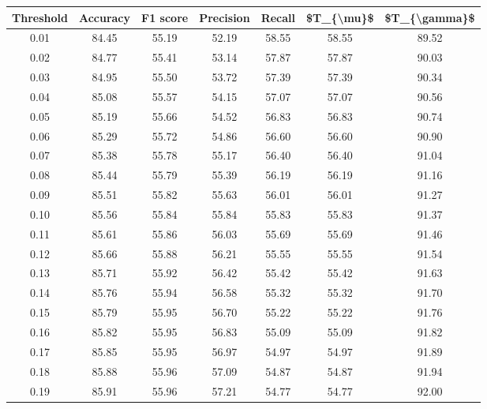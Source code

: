 \begin{tabular}{|c|c|c|c|c|c|c|}
\hline
 Threshold &  Accuracy &  F1 score &  Precision &  Recall &  \$T\_\{\textbackslash mu\}\$ &  \$T\_\{\textbackslash gamma\}\$ \\
\hline
      0.01 &     84.45 &     55.19 &      52.19 &   58.55 &      58.55 &         89.52 \\
      0.02 &     84.77 &     55.41 &      53.14 &   57.87 &      57.87 &         90.03 \\
      0.03 &     84.95 &     55.50 &      53.72 &   57.39 &      57.39 &         90.34 \\
      0.04 &     85.08 &     55.57 &      54.15 &   57.07 &      57.07 &         90.56 \\
      0.05 &     85.19 &     55.66 &      54.52 &   56.83 &      56.83 &         90.74 \\
      0.06 &     85.29 &     55.72 &      54.86 &   56.60 &      56.60 &         90.90 \\
      0.07 &     85.38 &     55.78 &      55.17 &   56.40 &      56.40 &         91.04 \\
      0.08 &     85.44 &     55.79 &      55.39 &   56.19 &      56.19 &         91.16 \\
      0.09 &     85.51 &     55.82 &      55.63 &   56.01 &      56.01 &         91.27 \\
      0.10 &     85.56 &     55.84 &      55.84 &   55.83 &      55.83 &         91.37 \\
      0.11 &     85.61 &     55.86 &      56.03 &   55.69 &      55.69 &         91.46 \\
      0.12 &     85.66 &     55.88 &      56.21 &   55.55 &      55.55 &         91.54 \\
      0.13 &     85.71 &     55.92 &      56.42 &   55.42 &      55.42 &         91.63 \\
      0.14 &     85.76 &     55.94 &      56.58 &   55.32 &      55.32 &         91.70 \\
      0.15 &     85.79 &     55.95 &      56.70 &   55.22 &      55.22 &         91.76 \\
      0.16 &     85.82 &     55.95 &      56.83 &   55.09 &      55.09 &         91.82 \\
      0.17 &     85.85 &     55.95 &      56.97 &   54.97 &      54.97 &         91.89 \\
      0.18 &     85.88 &     55.96 &      57.09 &   54.87 &      54.87 &         91.94 \\
      0.19 &     85.91 &     55.96 &      57.21 &   54.77 &      54.77 &         92.00 \\

\end{tabular}
